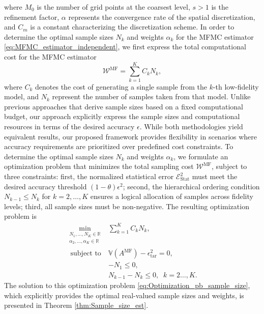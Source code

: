 %
where $M_0$ is the number of grid points at the coarsest level, $s>1$ is the refinement factor, $\alpha$ represents the convergence rate of the spatial discretization, and $C_m$ is a constant characterizing the discretization scheme. In order to determine the optimal sample sizes $N_k$ and weights $\alpha_k$ for the MFMC estimator \eqref{eq:MFMC_estimator_independent}, we first express the total computational cost for the MFMC estimator
%
\[
\mathcal{W}^{\text{MF}} = \sum_{k=1}^K C_kN_k,
\]
%
where $C_k$ denotes the cost of generating a single sample from the $k$-th low-fidelity model, and $N_k$ represent the number of samples taken from that model. Unlike previous approaches \cite{PeWiGu:2016} that derive sample sizes based on a fixed computational budget, our approach explicitly express the sample sizes and computational resources in terms of the desired accuracy $\epsilon$. While both methodologies yield equivalent results, our proposed framework provides flexibility in scenarios where accuracy requirements are prioritized over predefined cost constraints. To determine the optimal sample sizes $N_k$ and weights $\alpha_k$,  we formulate an optimization problem that minimizes the total sampling cost $\mathcal{W}^{\text{MF}}$, subject to three constraints: first, the normalized statistical error $\mathcal{E}_{\text{Stat}}^2$ must meet the desired accuracy threshold $(1-\theta)\epsilon^2$; second,  the hierarchical ordering condition $N_{k-1}\le N_k$ for $k=2,\ldots, K$ ensures a logical allocation of samples across fidelity levels; third, all sample sizes must be non-negative. The resulting optimization problem is
%
\begin{equation}\label{eq:Optimization_pb_sample_size}
    \begin{array}{ll}
    \min \limits_{\begin{array}{c}\scriptstyle N_1,\ldots, N_K\in \mathbb{R} \\[-4pt]
\scriptstyle \alpha_2,\ldots,\alpha_K\in \mathbb{R}
\end{array}} &\displaystyle\sum\limits_{k=1}^K C_kN_k,\\
       \;\,\text{subject to} &\mathbb{V}\left(A^{\text{MF}}\right)- \epsilon_{\text{tar}}^2 = 0,\\[2pt]
       &\displaystyle -N_1\le 0,\\
        &\displaystyle N_{k-1}-N_k\le 0, \;\; k=2\ldots,K.
    \end{array}
\end{equation}
%
The solution to this optimization problem \eqref{eq:Optimization_pb_sample_size}, which explicitly provides the optimal real-valued sample sizes and weights, is presented in Theorem \ref{thm:Sample_size_est}.
